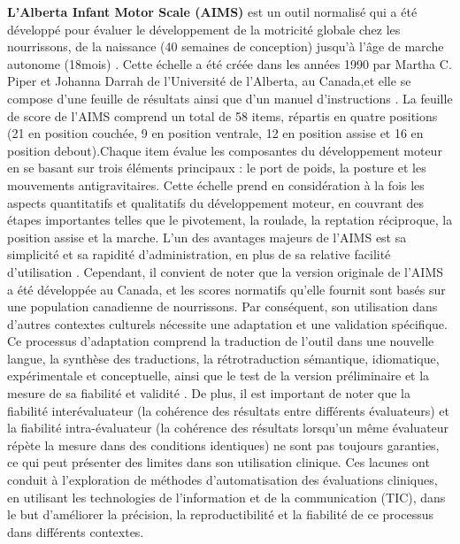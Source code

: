 \documentclass[8pt]{article}
\begin{document}
\textbf{L'Alberta Infant Motor Scale (AIMS)} est un outil normalisé qui a été développé pour évaluer le développement de la motricité globale chez les nourrissons, de la naissance (40 semaines de conception) jusqu'à l'âge de marche autonome (18mois) \cite{noauthor_motor_nodate}. Cette échelle a été créée dans les années 1990 par Martha C. Piper et Johanna Darrah de l'Université de l'Alberta, au Canada\cite{noauthor_motor_nodate},et elle se compose d'une feuille de résultats ainsi que d'un manuel d'instructions \cite{noauthor_motor_nodate}. La feuille de score de l'AIMS comprend un total de 58 items, répartis en quatre positions (21 en position couchée, 9 en position ventrale, 12 en position assise et 16 en position debout).Chaque item évalue les composantes du développement moteur en se basant sur trois éléments principaux : le port de poids, la posture et les mouvements antigravitaires. Cette échelle prend en considération à la fois les aspects quantitatifs et qualitatifs du développement moteur, en couvrant des étapes importantes telles que le pivotement, la roulade, la reptation réciproque, la position assise et la marche. L'un des avantages majeurs de l'AIMS est sa simplicité et sa rapidité d'administration, en plus de sa relative facilité d'utilisation \cite{eliks_alberta_2022}. Cependant, il convient de noter que la version originale de l'AIMS a été développée au Canada, et les scores normatifs qu'elle fournit sont basés sur une population canadienne de nourrissons. Par conséquent, son utilisation dans d'autres contextes culturels nécessite une adaptation et une validation spécifique. Ce processus d'adaptation comprend la traduction de l'outil dans une nouvelle langue, la synthèse des traductions, la rétrotraduction sémantique, idiomatique, expérimentale et conceptuelle, ainsi que le test de la version préliminaire et la mesure de sa fiabilité et validité \cite{boateng_best_2018}. De plus, il est important de noter que la fiabilité interévaluateur (la cohérence des résultats entre différents évaluateurs) et la fiabilité intra-évaluateur (la cohérence des résultats lorsqu'un même évaluateur répète la mesure dans des conditions identiques) ne sont pas toujours garanties, ce qui peut présenter des limites dans son utilisation clinique. Ces lacunes ont conduit à l'exploration de méthodes d'automatisation des évaluations cliniques, en utilisant les technologies de l'information et de la communication (TIC), dans le but d'améliorer la précision, la reproductibilité et la fiabilité de ce processus dans différents contextes.\\
 
\end{document}
